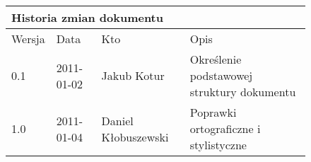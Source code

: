 \begin{figure}[h]
	\centering

\begin{tabular}{|p{}|p{}|p{}|p{}|}
	\hline
	\multicolumn{4}{|l|}{Historia zmian dokumentu} \\
	\hline
	Wersja & Data & Kto & Opis \\
	\hline
	0.1 & 2011-01-02 & Jakub Kotur &
	Określenie podstawowej struktury dokumentu \\
	\hline
	1.0 & 2011-01-04 & Daniel Kłobuszewski &
	Poprawki ortograficzne i stylistyczne \\
	\hline
\end{tabular}

	\label{tab:metric}
\end{figure}


